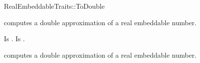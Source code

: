 \begin{ccRefConcept}{RealEmbeddableTraits::ToDouble}

\ccDefinition

 computes a double approximation of a real
embeddable number. 
 
\ccRefines 



\ccTypes
{} 
        { Is .}
        { Is .}

\ccOperations
{}

        { computes a double approximation of a real embeddable number. }


\ccSeeAlso

\\

\end{ccRefConcept} 